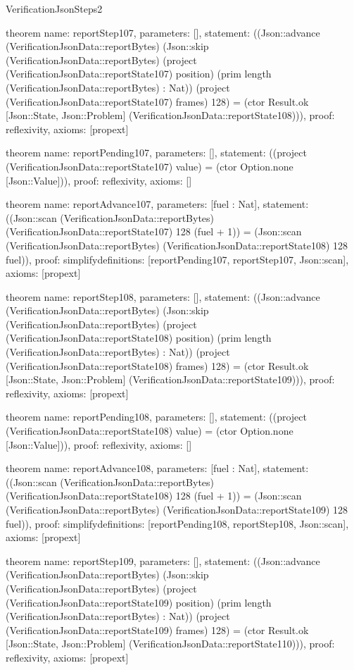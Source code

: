 \begin{lexlean}{VerificationJsonSteps2}
\begin{semanticmodule}
theorem{
  name: reportStep107,
  parameters: [],
  statement: ((Json::advance (VerificationJsonData::reportBytes) (Json::skip (VerificationJsonData::reportBytes) (project (VerificationJsonData::reportState107) position) (prim length (VerificationJsonData::reportBytes) : Nat)) (project (VerificationJsonData::reportState107) frames) 128) = (ctor Result.ok [Json::State, Json::Problem] (VerificationJsonData::reportState108))),
  proof: reflexivity{},
  axioms: [propext]
}

theorem{
  name: reportPending107,
  parameters: [],
  statement: ((project (VerificationJsonData::reportState107) value) = (ctor Option.none [Json::Value])),
  proof: reflexivity{},
  axioms: []
}

theorem{
  name: reportAdvance107,
  parameters: [fuel : Nat],
  statement: ((Json::scan (VerificationJsonData::reportBytes) (VerificationJsonData::reportState107) 128 (fuel + 1)) = (Json::scan (VerificationJsonData::reportBytes) (VerificationJsonData::reportState108) 128 fuel)),
  proof: simplify{definitions: [reportPending107, reportStep107, Json::scan]},
  axioms: [propext]
}

theorem{
  name: reportStep108,
  parameters: [],
  statement: ((Json::advance (VerificationJsonData::reportBytes) (Json::skip (VerificationJsonData::reportBytes) (project (VerificationJsonData::reportState108) position) (prim length (VerificationJsonData::reportBytes) : Nat)) (project (VerificationJsonData::reportState108) frames) 128) = (ctor Result.ok [Json::State, Json::Problem] (VerificationJsonData::reportState109))),
  proof: reflexivity{},
  axioms: [propext]
}

theorem{
  name: reportPending108,
  parameters: [],
  statement: ((project (VerificationJsonData::reportState108) value) = (ctor Option.none [Json::Value])),
  proof: reflexivity{},
  axioms: []
}

theorem{
  name: reportAdvance108,
  parameters: [fuel : Nat],
  statement: ((Json::scan (VerificationJsonData::reportBytes) (VerificationJsonData::reportState108) 128 (fuel + 1)) = (Json::scan (VerificationJsonData::reportBytes) (VerificationJsonData::reportState109) 128 fuel)),
  proof: simplify{definitions: [reportPending108, reportStep108, Json::scan]},
  axioms: [propext]
}

theorem{
  name: reportStep109,
  parameters: [],
  statement: ((Json::advance (VerificationJsonData::reportBytes) (Json::skip (VerificationJsonData::reportBytes) (project (VerificationJsonData::reportState109) position) (prim length (VerificationJsonData::reportBytes) : Nat)) (project (VerificationJsonData::reportState109) frames) 128) = (ctor Result.ok [Json::State, Json::Problem] (VerificationJsonData::reportState110))),
  proof: reflexivity{},
  axioms: [propext]
}


\end{semanticmodule}
\end{lexlean}
